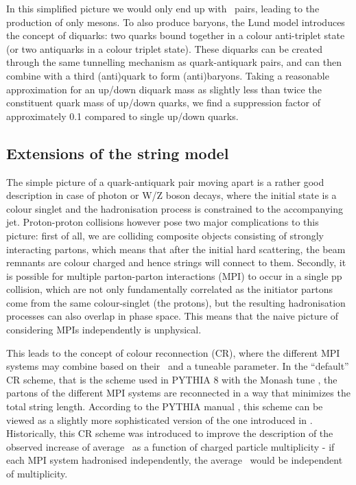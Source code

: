   In this simplified picture we would only end up with \qqbar\ pairs, leading to the production of only mesons. To also produce baryons, the Lund model introduces the concept of diquarks: two quarks bound together in a colour anti-triplet state (or two antiquarks in a colour triplet state). These diquarks can be created through the same tunnelling mechanism as quark-antiquark pairs, and can then combine with a third (anti)quark to form (anti)baryons. Taking a reasonable approximation for an up/down diquark mass as slightly less than twice the constituent quark mass of up/down quarks, we find a suppression factor of approximately 0.1 compared to single up/down quarks. 


  \subsection{Extensions of the string model}
    The simple picture of a quark-antiquark pair moving apart is a rather good description in case of photon or W/Z boson decays, where the initial state is a colour singlet and the hadronisation process is constrained to the accompanying jet. Proton-proton collisions however pose two major complications to this picture: first of all, we are colliding composite objects consisting of strongly interacting partons, which means that after the initial hard scattering, the beam remnants are colour charged and hence strings will connect to them. Secondly, it is possible for multiple parton-parton interactions (MPI) to occur in a single pp collision, which are not only fundamentally correlated as the initiator partons come from the same colour-singlet (the protons), but the resulting hadronisation processes can also overlap in phase space. This means that the naive picture of considering MPIs independently is unphysical. 

    This leads to the concept of colour reconnection (CR), where the different MPI systems may combine based on their \pt\ and a tuneable parameter. In the ``default'' CR scheme, that is the scheme used in PYTHIA 8 with the Monash tune \cite{MonashTune}, the partons of the different MPI systems are reconnected in a way that minimizes the total string length. According to the PYTHIA manual \cite{PythiaManual}, this scheme can be viewed as a slightly more sophisticated version of the one introduced in \cite{firstCR}. Historically, this CR scheme was introduced to improve the description of the observed increase of average \pt\ as a function of charged particle multiplicity - if each MPI system hadronised independently, the average \pt\ would be independent of multiplicity. \cite{UA1} 

